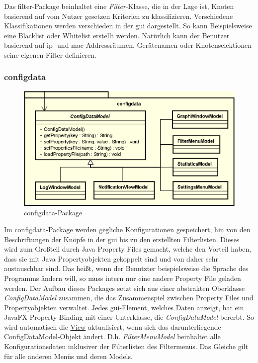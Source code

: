     \medskip
    Das filter-Package beinhaltet eine \textit{Filter}-Klasse, die in der Lage ist,
    Knoten basierend auf vom Nutzer gesetzen Kriterien zu klassifizieren. Verschiedene
    Klassifikationen werden verschieden in der \gls{gui} dargestellt. So kann
    Beispielsweise eine Blacklist oder Whitelist erstellt werden.
    Natürlich kann der Benutzer basierend auf \gls{ip}- und \gls{mac}-Addressräumen,
    Gerätenamen oder Knotenselektionen seine eigenen Filter definieren.

    \subsubsection{configdata}
    \label{subsubsec:configdata}
    
    \begin{figure}[H]
      \centering
      \includegraphics[width=\textwidth]{../diagramimages/configdata.png}
      \caption{configdata-Package}
    \end{figure}
    
    \medskip
    Im configdata-Package werden gegliche Konfigurationen gespeichert, hin von den
    Beschriftungen der Knöpfe in der \gls{gui} bis zu den erstellten Filterlisten. Dieses
    wird zum Großteil durch Java Property Files gemacht, welche den Vorteil haben, dass
    sie mit Java Propertyobjekten gekoppelt sind und von daher sehr austauschbar sind.
    Das heißt, wenn der Benutzter beispielsweise die Sprache des Programms ändern
    will, so muss intern nur eine andere Property File geladen werden.
    \newline
    \newline
    Der Aufbau dieses Packages setzt sich aus einer abstrakten Oberklasse
    \textit{ConfigDataModel} zusammen, die das Zusammenspiel zwischen Property Files
    und Propertyobjekten verwaltet. Jedes \gls{gui}-Element, welches Daten anzeigt, hat
    ein JavaFX Property-Binding mit einer Unterklasse, die \textit{ConfigDataModel}
    bererbt. So wird automatisch die \hyperref[subsec:view]{View} aktualisiert,
    wenn sich das darunterliegende ConfigDataModel-Objekt ändert. D.h.
    \textit{FilterMenuModel} beinhaltet alle Konfigurationsdaten inklusiver der
    Filterlisten des Filtermenüs. Das Gleiche gilt für alle anderen Menüs und
    deren Models.


